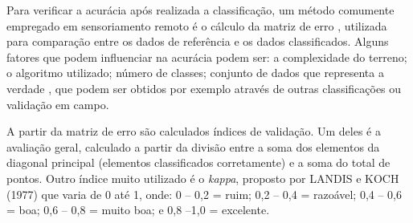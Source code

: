 Para verificar a acurácia após realizada a classificação, um método
comumente empregado em sensoriamento remoto é o cálculo da matriz de erro \cite{lu-weng}, utilizada para comparação entre os dados de referência e os dados classificados. Alguns fatores que podem influenciar na acurácia
podem ser: a complexidade do terreno; o algoritmo utilizado; número de
classes; conjunto de dados que representa a verdade \cite{meneses2012introduccao}, que podem
ser obtidos por exemplo através de outras classificações ou validação em
campo.

A partir da matriz de erro são calculados índices de validação. Um
deles é a avaliação geral, calculado a partir da divisão entre a soma
dos elementos da diagonal principal (elementos classificados
corretamente) e a soma do total de pontos. Outro índice muito utilizado
é o \emph{kappa}, proposto por LANDIS e KOCH (1977) que varia de 0 até
1, onde: 0 -- 0,2 = ruim; 0,2 -- 0,4 = razoável; 0,4 -- 0,6 = boa; 0,6
-- 0,8 = muito boa; e 0,8 --1,0 = excelente. \cite{meneses2012introduccao}
